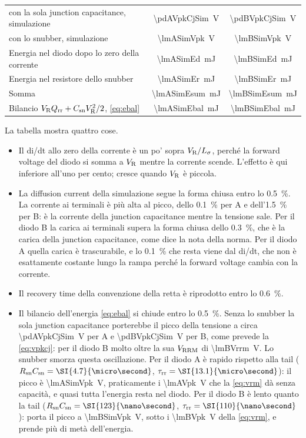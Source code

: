 \documentclass[10pt,a4paper]{scrartcl}
\let\newcommand\pdvaluedefine
\newcommand{\VR}{V_\mathrm{R}}
\newcommand{\Qrr}{Q_\mathrm{rr}}
\newcommand{\taurr}{\tau_\mathrm{rr}}
\newcommand{\Csn}{C_\mathrm{sn}}
\newcommand{\Rsn}{R_\mathrm{sn}}
\newcommand{\Vrrm}{V_\mathrm{RRM}}
\newcommand{\Ls}{L_\sigma}                    %
\begin{document}
\begin{table}[htb]
\begin{tabular}{@{}lcc@{}}
\quad con la sola junction capacitance, simulazione & \SI{\pdAVpkCjSim}{\volt} & \SI{\pdBVpkCjSim}{\volt} \\
\quad con lo snubber, simulazione & \SI{\lmASimVpk}{\volt} & \SI{\lmBSimVpk}{\volt} \\
Energia nel diodo dopo lo zero della corrente & \SI{\lmASimEd}{\milli\joule} & \SI{\lmBSimEd}{\milli\joule} \\
Energia nel resistore dello snubber & \SI{\lmASimEr}{\milli\joule} & \SI{\lmBSimEr}{\milli\joule} \\
Somma & \SI{\lmASimEsum}{\milli\joule} & \SI{\lmBSimEsum}{\milli\joule} \\
Bilancio $\VR\Qrr + \Csn\VR^2/2$, \eqref{eq:ebal} & \SI{\lmASimEbal}{\milli\joule} & \SI{\lmBSimEbal}{\milli\joule} \\
\bottomrule
\end{tabular}
\end{table}

La tabella mostra quattro cose.
\begin{itemize}
\item Il di/dt allo zero della corrente è un po' sopra $\VR/\Ls$, perché la forward voltage del diodo si somma a $\VR$ mentre la corrente scende. L'effetto è qui inferiore all'uno per cento; cresce quando $\VR$ è piccola.
\item La diffusion current della simulazione segue la forma chiusa entro lo \SI{0.5}{\percent}. La corrente ai terminali è più alta al picco, dello \SI{0.1}{\percent} per A e dell'\SI{1.5}{\percent} per B: è la corrente della junction capacitance mentre la tensione sale. Per il diodo B la carica ai terminali supera la forma chiusa dello \SI{0.3}{\percent}, che è la carica della junction capacitance, come dice la nota della norma. Per il diodo A quella carica è trascurabile, e lo \SI{0.1}{\percent} che resta viene dal di/dt, che non è esattamente costante lungo la rampa perché la forward voltage cambia con la corrente.
\item Il recovery time della convenzione della retta è riprodotto entro lo \SI{0.6}{\percent}.
\item Il bilancio dell'energia \eqref{eq:ebal} si chiude entro lo \SI{0.5}{\percent}. Senza lo snubber la sola junction capacitance porterebbe il picco della tensione a circa \SI{\pdAVpkCjSim}{\volt} per A e \SI{\pdBVpkCjSim}{\volt} per B, come prevede la \eqref{eq:vpkcj}: per il diodo B molto oltre la sua $\Vrrm$ di \SI{\lmBVrrm}{\volt}. Lo snubber smorza questa oscillazione. Per il diodo A è rapido rispetto alla tail ($\Rsn\Csn = \SI{\lmARsnCsn}{\micro\second}$, $\taurr = \SI{\lmATrr}{\micro\second}$): il picco è \SI{\lmASimVpk}{\volt}, praticamente i \SI{\lmAVpk}{\volt} che la \eqref{eq:vrm} dà senza capacità, e quasi tutta l'energia resta nel diodo. Per il diodo B è lento quanto la tail ($\Rsn\Csn = \SI{\lmBRsnCsn}{\nano\second}$, $\taurr = \SI{\lmBTrr}{\nano\second}$): porta il picco a \SI{\lmBSimVpk}{\volt}, sotto i \SI{\lmBVpk}{\volt} della \eqref{eq:vrm}, e prende più di metà dell'energia.
\end{itemize}
\end{document}
